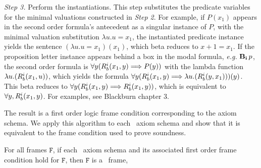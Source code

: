 \emph{Step 3.} Perform the instantiations. This step substitutes the predicate variables for the minimal valuations constructed in \emph{Step 2}. For example, if $P(x_1)$ appears in the second order formula's antecedent as a singular instance of $P$, with the minimal valuation substitution $\lambda u.u=x_1$, the instantiated predicate instance yields the sentence $(\lambda u.u=x_1)(x_1)$, which beta reduces to $x+1=x_1$. If the proposition letter instance appears behind a box in the modal formula, \emph{e.g.} $\mathbf{B}_{\mathbf{i}}\,p$, the second order formula is $\forall y(R_{b}^i(x_1, y) \Longrightarrow P(y))$ with the lambda function $\lambda u.(R_{b}^i(x_1, u))$, which yields the formula  $\forall y(R_{b}^i(x_1, y) \Longrightarrow \lambda u.(R_{b}^i(y, x_1)))(y)$. This beta reduces to $\forall y(R_{b}^i(x_1, y) \Longrightarrow R_{b}^i(x_1, y))$, which is equivalent to $\forall y, R_{b}^i(x_1, y)$. For examples, see Blackburn \etal\cite{modal} chapter 3.

The result is a first order logic frame condition corresponding to the axiom schema. We apply this algorithm to each \DASL\ axiom schema and show that it is equivalent to the frame condition used to prove soundness.

\begin{lemma}\label{schema_to_frame}
	For all frames $\mathtt{F}$, if each \DASL\ axiom schema and its associated first order frame condition hold for $\mathtt{F}$, then $\mathtt{F}$ is a \DASL\ frame,
\end{lemma}

